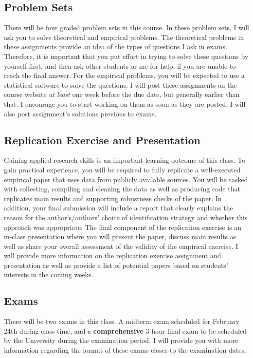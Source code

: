 \documentclass[letterpaper,12pt]{article}
\theoremstyle{dotlessS}
\begin{document}
\subsection*{Problem Sets}
There will be four graded problem sets in this course. In these problem sets, I will ask you to solve  theoretical and empirical problems. The theoretical problems in these assignments provide an idea of the types of questions I ask in exams. Therefore, it is important that you put effort in trying to solve these questions by yourself first, and then ask other students or me for help, if you are unable to reach the final answer. For the empirical problems, you will be  expected to use a statistical software to solve the questions. I will post these assignments on the course website \textit{at least} one week before the due date, but generally earlier than that. I encourage you to start working on them as soon as they are posted. I will also post assignment's solutions previous to exams. \\

\subsection*{Replication Exercise and Presentation}
Gaining applied research skills is an important learning outcome of this class. To gain practical experience, you will be required to fully replicate a well-executed empirical paper that uses data from publicly available sources. You will be tasked with collecting, compiling and cleaning the data as well as producing code that replicates main results and supporting robustness checks of the paper. In addition, your final submission will include a report that clearly explains the reason for the author's/authors' choice of identification strategy and whether this approach was appropriate. The final component of the replication exercise is an in-class presentation where you will present the paper, discuss main results as well as share your overall assessment of the validity of the empirical exercise. I will provide more information on the replication exercise assignment and presentation as well as provide a list of potential papers based on students' interests in the coming weeks.        

       
\subsection*{Exams}
There will be two exams in this class. A midterm exam scheduled for February 24th during class time, and a \textbf{comprehensive} 3-hour final exam to be scheduled by the University during the examination period. I will provide you with more information regarding the format of these exams closer to the examination dates.  
\end{document}
